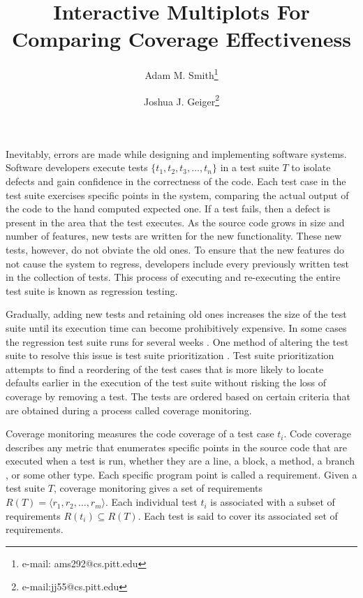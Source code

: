 \documentclass{vgtc}                          %
\title{Interactive Multiplots For Comparing Coverage Effectiveness}
\author{Adam M. Smith\thanks{e-mail: ams292@cs.pitt.edu} %
\and Joshua J. Geiger\thanks{e-mail:jj55@cs.pitt.edu}} %
\affiliation{\scriptsize University of Pittsburgh}
\begin{document}


\maketitle


Inevitably, errors are made while designing and implementing software systems. Software developers execute tests $\{t_1, t_2, t_3,\ldots, t_n\}$ in a test suite $T$ to isolate defects and gain confidence in the correctness of the code.  Each test case in the test suite exercises specific points in the system, comparing the actual output of the code to the hand computed expected one.  If a test fails, then a defect is present in the area that the test executes.  As the source code grows in size and number of features, new tests are written for the new functionality.  These new tests, however, do not obviate the old ones.  To ensure that the new features do not cause the system to regress, developers include every previously written test in the collection of tests.  This process of executing and re-executing the entire test suite is known as regression testing.  

Gradually, adding new tests and retaining old ones increases the size of the test suite until its execution time can become prohibitively expensive.  In some cases the regression test suite runs for several weeks \cite{empiricalfamily}.  One method of altering the test suite to resolve this issue is test suite prioritization \cite{rothermelprioritizing2001}.  Test suite prioritization attempts to find a reordering of the test cases that is more likely to locate defaults earlier in the execution of the test suite without risking the loss of coverage by removing a test.  The tests are ordered based on certain criteria that are obtained during a process called coverage monitoring.  

Coverage monitoring measures the code coverage of a test case $t_i$.  Code coverage describes any metric that enumerates specific points in the source code that are executed when a test is run, whether they are a line, a block, a method, a branch \cite{zhu}, or some other type. Each specific program point is called a requirement.  Given a test suite $T$, coverage monitoring gives a set of requirements $R(T) = \langle r_1, r_2,\ldots,r_m \rangle$.  Each individual test $t_i$ is associated with a subset of requirements $R(t_i) \subseteq R(T)$.  Each test is said to cover its associated set of requirements.  
\end{document}
